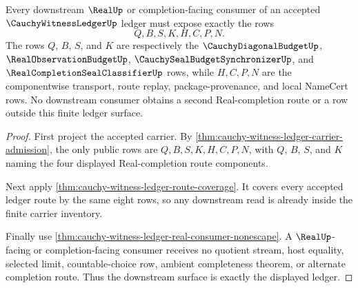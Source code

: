 \begin{theorem}
\label{thm:cauchy-witness-ledger-root-downstream-totality}
Every downstream $\RealUp$ or completion-facing consumer of an accepted
$\CauchyWitnessLedgerUp$ ledger must expose exactly the rows
$$
Q,B,S,K,H,C,P,N.
$$
The rows $Q$, $B$, $S$, and $K$ are respectively the
$\CauchyDiagonalBudgetUp$, $\RealObservationBudgetUp$,
$\CauchySealBudgetSynchronizerUp$, and
$\RealCompletionSealClassifierUp$ rows, while $H,C,P,N$ are the componentwise
transport, route replay, package-provenance, and local NameCert rows. No
downstream consumer obtains a second Real-completion route or a row outside
this finite ledger surface.
\end{theorem}
\begin{proof}
First project the accepted carrier. By
\autoref{thm:cauchy-witness-ledger-carrier-admission}, the only public rows
are $Q,B,S,K,H,C,P,N$, with $Q$, $B$, $S$, and $K$ naming the four displayed
Real-completion route components.

Next apply \autoref{thm:cauchy-witness-ledger-route-coverage}. It covers every
accepted ledger route by the same eight rows, so any downstream read is already
inside the finite carrier inventory.

Finally use \autoref{thm:cauchy-witness-ledger-real-consumer-nonescape}. A
$\RealUp$-facing or completion-facing consumer receives no quotient stream,
host equality, selected limit, countable-choice row, ambient completeness
theorem, or alternate completion route. Thus the downstream surface is exactly
the displayed ledger.
\end{proof}

